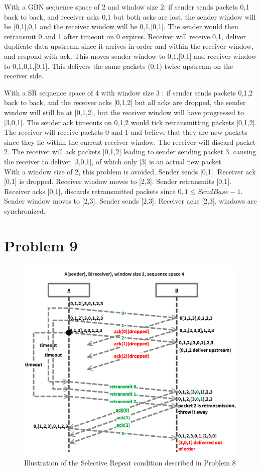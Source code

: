 \documentclass[letter,10pt]{article}
\begin{document}
With a GBN sequence space of 2 and window size 2: if sender sends packets 0,1 back to back, and receiver acks 0,1 but both acks are lost, the sender window will be [0,1],0,1 and the receiver window will be 0,1,[0,1]. The sender would then retransmit 0 and 1 after timeout on 0 expires. Receiver will receive 0,1, deliver duplicate data upstream since it arrives in order and within the receiver window, and respond with ack. This moves sender window to 0,1,[0,1] and receiver window to 0,1,0,1,[0,1]. This delivers the same packets (0,1) twice upstream on the receiver side.

With a SR sequence space of 4 with window size 3 : if sender sends packets 0,1,2 back to back, and the receiver acks [0,1,2] but all acks are dropped, the sender window will still be at [0,1,2], but the receiver window will have progressed to [3,0,1]. The sender ack timeouts on 0,1,2 would tick retransmitting packets [0,1,2]. The receiver will receive packets 0 and 1 and believe that they are new packets since they lie within the current receiver window.  The receiver will discard packet 2. The receiver will ack packets [0,1,2] leading to sender sending packet 3, causing the receiver to deliver [3,0,1], of which only [3] is an actual new packet. \\

With a window size of 2, this problem is avoided. Sender sends [0,1]. Receiver ack [0,1] is dropped. Receiver window moves to [2,3]. Sender retransmits [0,1]. Receiver acks [0,1], discards retransmitted packets since $0,1 \leq SendBase - 1$. Sender window moves to [2,3]. Sender sends [2,3]. Receiver acks [2,3], windows are synchronized.

\section{Problem 9}
\begin{figure}[h!]
\begin{center}
	\noindent \includegraphics[height=.6\textheight]{./figures/9}
	\caption{Illustration of the Selective Repeat condition described in Problem 8}
\end{center}
\end{figure}
	
\end{document}
